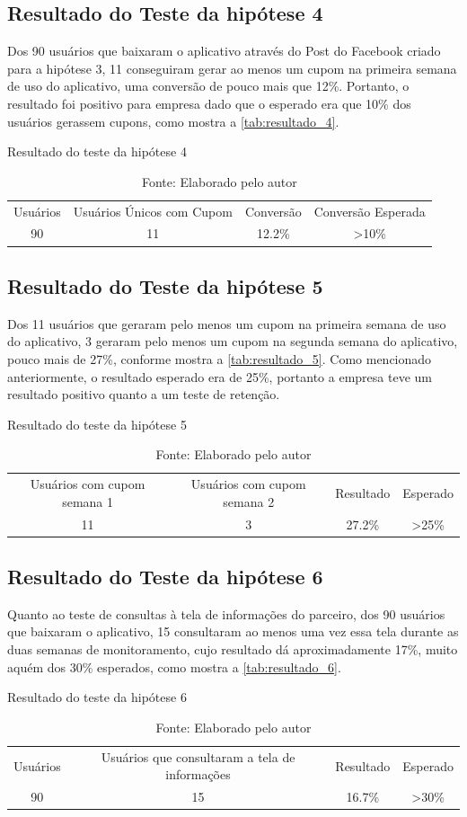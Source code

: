 \subsection{Resultado do Teste da hipótese 4}
\label{cha:resultado_4}
Dos 90 usuários que baixaram o aplicativo através do Post do Facebook criado para a hipótese 3, 11 conseguiram gerar ao menos um cupom na primeira semana de uso do aplicativo, uma conversão de pouco mais que 12\%. Portanto, o resultado foi positivo para empresa dado que o esperado era que 10\% dos usuários gerassem cupons, como mostra a \autoref{tab:resultado_4}.
\begin{table}[H]
\centering
\caption{Resultado do teste da hipótese 4}
\label{tab:resultado_4}
\begin{tabular}{cccc}
Usuários & Usuários Únicos com Cupom & Conversão & Conversão Esperada \\
90       & 11  & 12.2\%   & \textgreater 10\%
\end{tabular}
\caption* {Fonte: Elaborado pelo autor}    
\end{table}

\subsection{Resultado do Teste da hipótese 5}
\label{cha:resultado_5}
Dos 11 usuários que geraram pelo menos um cupom na primeira semana de uso do aplicativo, 3 geraram pelo menos um cupom na segunda semana do aplicativo, pouco mais de 27\%, conforme mostra a \autoref{tab:resultado_5}. Como mencionado anteriormente, o resultado esperado era de 25\%, portanto a empresa teve um resultado positivo quanto a um teste de retenção.
\begin{table}[H]
\centering
\caption{Resultado do teste da hipótese 5}
\label{tab:resultado_5}
\begin{tabular}{cccc}
Usuários com cupom semana 1 & Usuários com cupom semana 2 & Resultado & Esperado \\
11       & 3  & 27.2\%   & \textgreater 25\%
\end{tabular}
\caption* {Fonte: Elaborado pelo autor}    
\end{table}

\subsection{Resultado do Teste da hipótese 6}
\label{cha:resultado_6}
Quanto ao teste de consultas à tela de informações do parceiro, dos 90 usuários que baixaram o aplicativo, 15 consultaram ao menos uma vez essa tela durante as duas semanas de monitoramento, cujo resultado dá aproximadamente 17\%, muito aquém dos 30\% esperados, como mostra a \autoref{tab:resultado_6}.
\begin{table}[H]
\centering
\caption{Resultado do teste da hipótese 6}
\label{tab:resultado_6}
\begin{tabular}{cccc}
Usuários & Usuários que consultaram a tela de informações & Resultado & Esperado \\
90       & 15  & 16.7\%   & \textgreater 30\%
\end{tabular}
\caption* {Fonte: Elaborado pelo autor}    
\end{table}

